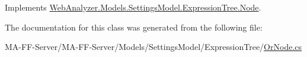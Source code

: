 Implements \hyperlink{class_web_analyzer_1_1_models_1_1_settings_model_1_1_expression_tree_1_1_node_a5cf0b866812c017ef1d0feb5f594499e}{Web\+Analyzer.\+Models.\+Settings\+Model.\+Expression\+Tree.\+Node}.



The documentation for this class was generated from the following file\+:\begin{DoxyCompactItemize}
\item 
M\+A-\/\+F\+F-\/\+Server/\+M\+A-\/\+F\+F-\/\+Server/\+Models/\+Settings\+Model/\+Expression\+Tree/\hyperlink{_or_node_8cs}{Or\+Node.\+cs}\end{DoxyCompactItemize}
